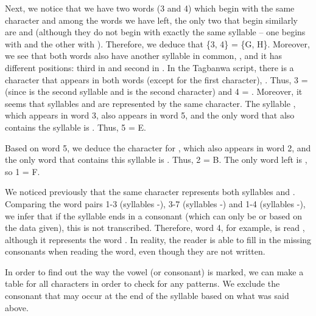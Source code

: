 \begin{refsection}
\begin{mysolution}
Next, we notice that we have two words (3 and 4) which begin with the same character and among the words we have left, the only two that begin similarly are  and  (although they do not begin with exactly the same syllable -- one begins with  and the other with ). Therefore, we deduce that \{3, 4\} = \{G, H\}. Moreover, we see that both words also have another syllable in common, , and it has different positions: third in  and second in . In the Tagbanwa script, there is a character that appears in both words (except for the first character), . Thus, 3 =  (since  is the second syllable and  is the second character) and 4 = . Moreover, it seems that syllables  and  are represented by the same character. The syllable , which appears in word 3, also appears in word 5, and the only word that also contains the syllable  is . Thus, 5 = E.

Based on word 5, we deduce the character for , which also appears in word 2, and the only word that contains this syllable is . Thus, 2 = B. The only word left is , so 1 = F.

We noticed previously that the same character represents both syllables  and . Comparing the word pairs 1-3 (syllables -), 3-7 (syllables -) and 1-4 (syllables -), we infer that if the syllable ends in a consonant (which can only be  or  based on the data given), this is not transcribed. Therefore, word 4, for example, is read , although it represents the word . In reality, the reader is able to fill in the missing consonants when reading the word, even though they are not written.

In order to find out the way the vowel (or consonant) is marked, we can make a table for all characters in order to check for any patterns. We exclude the consonant that may occur at the end of the syllable based on what was said above.


\end{mysolution}
\end{refsection}
